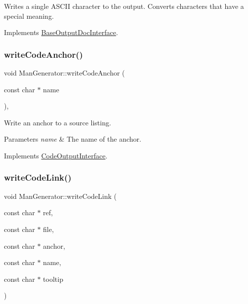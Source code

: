 Writes a single A\+S\+C\+II character to the output. Converts characters that have a special meaning. 

Implements \mbox{\hyperlink{class_base_output_doc_interface_a1577324720c1c71142dff84ae80b058d}{Base\+Output\+Doc\+Interface}}.

\mbox{\label{class_man_generator_a15b2642afa851662afe60fb00d4b20fb}} 
\subsubsection{\texorpdfstring{writeCodeAnchor()}{writeCodeAnchor()}}
{\footnotesize\ttfamily void Man\+Generator\+::write\+Code\+Anchor (\begin{DoxyParamCaption}\item[{const char $\ast$}]{name }\end{DoxyParamCaption})\hspace{0.3cm}{\ttfamily [inline]}, {\ttfamily [virtual]}}

Write an anchor to a source listing. 
\begin{DoxyParams}{Parameters}
{\em name} & The name of the anchor. \\
\hline
\end{DoxyParams}


Implements \mbox{\hyperlink{class_code_output_interface_a1f6394c4ef7c4143de90bcaf3a65c0b4}{Code\+Output\+Interface}}.

\mbox{\label{class_man_generator_ac4d91e5763d584238139d65d873e9f64}} 
\subsubsection{\texorpdfstring{writeCodeLink()}{writeCodeLink()}}
{\footnotesize\ttfamily void Man\+Generator\+::write\+Code\+Link (\begin{DoxyParamCaption}\item[{const char $\ast$}]{ref,  }\item[{const char $\ast$}]{file,  }\item[{const char $\ast$}]{anchor,  }\item[{const char $\ast$}]{name,  }\item[{const char $\ast$}]{tooltip }\end{DoxyParamCaption})\hspace{0.3cm}{\ttfamily [virtual]}}

